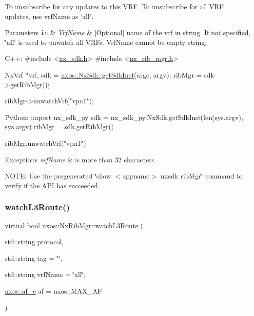 To unsubscribe for any updates to this V\+RF. To unsubscribe for all V\+RF updates, use vrf\+Name as \char`\"{}all\char`\"{}. 
\begin{DoxyParams}[1]{Parameters}
\mbox{\tt in}  & {\em Vrf\+Name} & \mbox{[}Optional\mbox{]} name of the vrf in string. If not specified, \char`\"{}all\char`\"{} is used to unwatch all V\+R\+Fs. Vrf\+Name cannot be empty string.\\
\hline
\end{DoxyParams}

\begin{DoxyCode}
C++:
\textcolor{preprocessor}{     #include <\mbox{\hyperlink{nx__sdk_8h}{nx\_sdk.h}}>}
\textcolor{preprocessor}{     #include <\mbox{\hyperlink{nx__rib__mgr_8h}{nx\_rib\_mgr.h}}>}

     NxVrf *vrf;
     sdk = \mbox{\hyperlink{classnxos_1_1_nx_sdk_a5050e2d26c40744b4fc7862068a83f39}{nxos::NxSdk::getSdkInst}}(argc, argv);
     ribMgr = sdk->getRibMgr();

     ribMgr->unwatchVrf(\textcolor{stringliteral}{"vpn1"});

Python:
     \textcolor{keyword}{import} nx\_sdk\_py
     sdk = nx\_sdk\_py.NxSdk.getSdkInst(len(sys.argv), sys.argv)
     ribMgr = sdk.getRibMgr()

     ribMgr.unwatchVrf(\textcolor{stringliteral}{"vpn1"})
\end{DoxyCode}



\begin{DoxyExceptions}{Exceptions}
{\em vrf\+Name} & is more than 32 characters.\\
\hline
\end{DoxyExceptions}
N\+O\+TE\+: Use the pregenerated \char`\"{}show $<$appname$>$ nxsdk rib\+Mgr\char`\"{} command to verify if the A\+PI has succeeded. \mbox{\label{classnxos_1_1_nx_rib_mgr_ab6749ea02f53fc8b2f6cdba21bbc335d}} 
\subsubsection{\texorpdfstring{watch\+L3\+Route()}{watchL3Route()}}
{\footnotesize\ttfamily virtual bool nxos\+::\+Nx\+Rib\+Mgr\+::watch\+L3\+Route (\begin{DoxyParamCaption}\item[{std\+::string}]{protocol,  }\item[{std\+::string}]{tag = {\ttfamily \char`\"{}\char`\"{}},  }\item[{std\+::string}]{vrf\+Name = {\ttfamily \char`\"{}all\char`\"{}},  }\item[{\mbox{\hyperlink{nx__common_8h_a3a667f48b94db10aa398940dc5bf72d7}{nxos\+::af\+\_\+e}}}]{af = {\ttfamily nxos\+:\+:MAX\+\_\+AF} }\end{DoxyParamCaption})\hspace{0.3cm}{\ttfamily [pure virtual]}}

